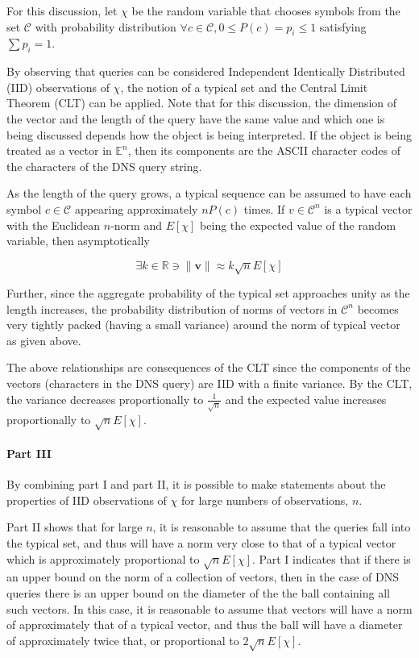 \documentclass[12pt]{report}
\theoremstyle{remark}
\theoremstyle{definition}
\theoremstyle{definition}
\theoremstyle{definition}
\begin{document}
For this discussion, let $\chi$ be the random variable that chooses symbols from
the set $\mathcal C$ with probability distribution $\forall c\in\mathcal C,
0\leq P(c)=p_i\leq1$ satisfying $\sum{p_i}=1$.

By observing that queries can be considered Independent Identically Distributed
(IID) observations of $\chi$, the notion of a typical set and the Central Limit 
Theorem (CLT) can be applied. Note that for this discussion, the dimension of
the vector and the length of the query have the same value and which one is
being discussed depends how the object is being interpreted. If the object is
being treated as a vector in $\mathbb E^n$, then its components are the ASCII
character codes of the characters of the DNS query string.

As the length of the query grows, a typical sequence can be assumed to have each
symbol $c\in\mathcal C$ appearing approximately $nP(c)$ times. If $v\in\mathcal
C^n$ is a typical vector with the Euclidean $n$-norm and $E[\chi]$
being the expected value of the random variable, then asymptotically

\begin{equation}
\label{dnssampling-evgrowth-eq}
\exists k\in\mathbb R \ni \|\mathbf v\|\approx k\sqrt n E[\chi]
\end{equation}

Further, since the aggregate probability of the typical set approaches unity as
the length increases, the probability distribution of norms of vectors in
$\mathcal C^n$ becomes very tightly packed (having a small variance) around the
norm of typical vector as given above.

The above relationships are consequences of the CLT
since the components of the vectors (characters in the DNS query) are IID with a
finite variance. By the CLT, the variance decreases proportionally to
$\frac{1}{\sqrt n}$ and the expected value increases proportionally to
$\sqrt{n}E[\chi]$.

\paragraph{Part III} By combining part I and part II, it is possible to make
statements about the properties of IID observations of $\chi$ for large numbers
of observations, $n$.

Part II shows that for large $n$, it is reasonable to assume that the queries
fall into the typical set, and thus will have a norm very close to that of a
typical vector which is approximately proportional to $\sqrt{n}E[\chi]$. Part I
indicates that if there is an upper bound on the norm of a collection of
vectors, then in the case of DNS queries there is an upper bound on the diameter
of the the ball containing all such vectors. In this case, it is reasonable to
assume that vectors will have a norm of approximately that of a typical vector,
and thus the ball will have a diameter of approximately twice that, or
proportional to $2\sqrt{n}E[\chi]$.
\end{document}
